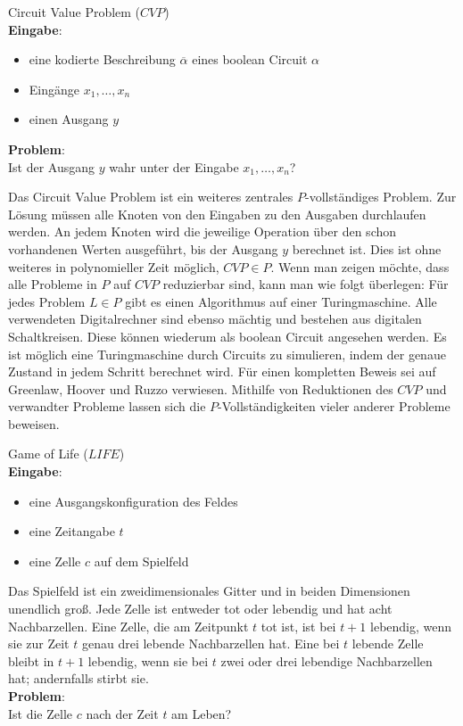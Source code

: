 \begin{problem}
    Circuit Value Problem ($CVP$) \\
    \textbf{Eingabe}:
    \begin{itemize}
        \item eine kodierte Beschreibung $\overline{\alpha}$ eines
            boolean Circuit $\alpha$
        \item Eingänge $x_1, \ldots, x_n$
        \item einen Ausgang $y$
    \end{itemize}
    \textbf{Problem}: \\
    Ist der Ausgang $y$ wahr unter der Eingabe $x_1, \ldots, x_n$?
\end{problem}

Das Circuit Value Problem ist ein weiteres zentrales $P$-vollständiges Problem.
Zur Lösung müssen alle Knoten von den Eingaben zu den Ausgaben durchlaufen
werden.
An jedem Knoten wird die jeweilige Operation über den schon vorhandenen Werten
ausgeführt, bis der Ausgang $y$ berechnet ist.
Dies ist ohne weiteres in polynomieller Zeit möglich, $CVP \in P$.
Wenn man zeigen möchte, dass alle Probleme in $P$ auf $CVP$ reduzierbar sind,
kann man wie folgt überlegen:
Für jedes Problem $L \in P$ gibt es einen Algorithmus auf einer Turingmaschine.
Alle verwendeten Digitalrechner sind ebenso mächtig und bestehen aus digitalen
Schaltkreisen.
Diese können wiederum als boolean Circuit angesehen werden.
Es ist möglich eine Turingmaschine durch Circuits zu simulieren, indem der
genaue Zustand in jedem Schritt berechnet wird. \cite[S.59f,71f]{greenlaw}
Für einen kompletten Beweis sei auf Greenlaw, Hoover und Ruzzo \cite[Kapitel 6]{greenlaw}
verwiesen.
Mithilfe von Reduktionen des $CVP$ und verwandter Probleme lassen sich die
$P$-Vollständigkeiten vieler anderer Probleme beweisen.

\begin{problem}
    Game of Life ($LIFE$) \\
    \textbf{Eingabe}:
    \begin{itemize}
        \item eine Ausgangskonfiguration des Feldes
        \item eine Zeitangabe $t$
        \item eine Zelle $c$ auf dem Spielfeld
    \end{itemize}
    Das Spielfeld ist ein zweidimensionales Gitter und in beiden Dimensionen
    unendlich groß.
    Jede Zelle ist entweder tot oder lebendig und hat acht Nachbarzellen.
    Eine Zelle, die am Zeitpunkt $t$ tot ist, ist bei $t+1$ lebendig,
    wenn sie zur Zeit $t$ genau drei lebende Nachbarzellen hat.
    Eine bei $t$ lebende Zelle bleibt in $t+1$ lebendig, wenn sie bei $t$ zwei
    oder drei lebendige Nachbarzellen hat; andernfalls stirbt sie. \\
    \textbf{Problem}: \\
    Ist die Zelle $c$ nach der Zeit $t$ am Leben?
    \cite[S.211]{greenlaw}
\end{problem}


